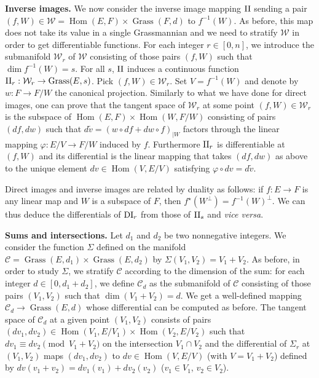 \documentclass{sig-alternate}
\DeclareMathOperator{\Hom}{Hom}
\DeclareMathOperator{\Grass}{Grass}
\newcommand{\DI}{\text{\rm DI}}
\newcommand{\II}{\text{\rm II}}
\begin{document}
\smallskip

\noindent
{\bf Inverse images.}
We now consider the inverse image mapping $\II$ sending a 
pair $(f,W) \in \mathcal W = \Hom(E,F) \times \Grass(F,d)$ to 
$f^{-1}(W)$. As before, this map does not take its value in a single 
Grassmannian and we need to stratify $\mathcal W$ in order to get 
differentiable functions. For each integer $r \in [0,n]$, we introduce 
the submanifold $\mathcal W_r$ of $\mathcal W$ consisting of those 
pairs $(f,W)$ such that $\dim f^{-1}(W) = s$. For all $s$, $\II$ 
induces a continuous function
$\II_r : \mathcal W_r \to \Grass(E,s)$.
Pick $(f,W) \in \mathcal W_r$. Set $V = f^{-1}(W)$ and denote by $w : F 
\to F/W$ the canonical projection.
Similarly to what we have done for direct images, one can prove that
the tangent space of $\mathcal W_r$ at some point $(f,W) \in \mathcal
W_r$ is the subspace of $\Hom(E,F) \times \Hom(W,F/W)$ consisting of 
pairs $(df,dw)$ such that
$d \tilde v = (w \circ df + dw \circ f)_{|W}$
factors through the linear mapping $\varphi : E/V \to F/W$ induced by 
$f$. Furthermore $\II_r$ is differentiable at $(f,W)$ and its 
differential is the linear mapping that takes $(df,dw)$ as above to the 
unique element $dv \in \Hom(V,E/V)$ satisfying $\varphi \circ dv =
d\tilde v$.

Direct images and inverse images are related by duality
as follows: if $f : E \to F$ is any linear map and $W$ is a subspace
of $F$, then $f^\star(W^\perp) = f^{-1}(W)^\perp$. We 
can thus deduce the differentials of $\DI_r$ from those of $\II_s$ and 
\emph{vice versa}.


\smallskip

\noindent
{\bf Sums and intersections.}
Let $d_1$ and $d_2$ be two nonnegative integers. We consider the 
function $\Sigma$ defined on the manifold $\mathcal C = \Grass(E,d_1) 
\times \Grass(E,d_2)$ by $\Sigma(V_1, V_2) = V_1 + V_2$. As before, in 
order to study $\Sigma$, we stratify $\mathcal C$ according to the 
dimension of the sum: for each integer $d \in [0, d_1+d_2]$, we define 
$\mathcal C_d$ as the submanifold of $\mathcal C$ consisting of those 
pairs $(V_1, V_2)$ such that $\dim(V_1 + V_2) = d$. We get a 
well-defined mapping $\mathcal C_d \to \Grass(E,d)$ whose differential
can be computed as before. The
tangent space of $\mathcal C_d$ at a given point $(V_1, V_2)$ consists 
of pairs $(dv_1, dv_2) \in \Hom(V_1, E/V_1)
\times \Hom(V_2, E/V_2)$ such that $dv_1 \equiv dv_2 \pmod{V_1 + V_2}$ 
on the intersection $V_1 \cap V_2$ and the differential of $\Sigma_r$
at $(V_1, V_2)$ maps $(dv_1, dv_2)$ to $dv \in \Hom(V, E/V)$ (with $V
= V_1 + V_2$) defined by $dv(v_1 + v_2) = dv_1(v_1) + dv_2(v_2)$ ($v_1
\in V_1$, $v_2 \in V_2$).
\end{document}
